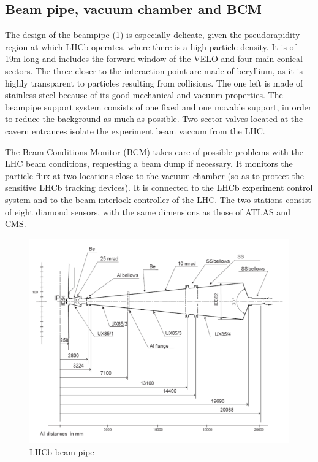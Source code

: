 \subsection{Beam pipe, vacuum chamber and BCM} %
The design of the beampipe (\ref{fig:beampipe}) is especially delicate, given the pseudorapidity region at which LHCb operates, where there is a high particle density. It is of 19m long and includes the forward window of the VELO and four main conical sectors. The three closer to the interaction point are made of beryllium, as it is highly transparent to particles resulting from collisions. The one left is made of stainless steel because of its good mechanical and vacuum properties. The beampipe support system consists of one fixed and one movable support, in order to reduce the background as much as possible. Two sector valves located at the cavern entrances isolate the experiment beam vaccum from the LHC.

The Beam Conditions Monitor (BCM) takes care of possible problems with the LHC beam conditions, requesting a beam dump if necessary. It monitors the particle flux at two locations close to the vacuum chamber (so as to protect the sensitive LHCb tracking devices). It is connected to the LHCb experiment control system and to the beam interlock controller of the LHC. The two stations consist of eight diamond sensors, with the same dimensions as those of ATLAS and CMS.
 
\begin{figure} [htb!]
\begin{center}
\includegraphics[scale=0.6]{figs/beampipe.png}
\caption{LHCb beam pipe \label{fig:beampipe}}
\end{center}
\end{figure}


